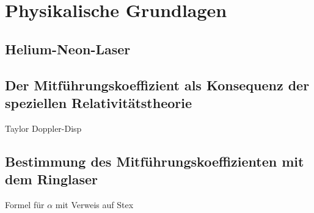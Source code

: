 \section{Physikalische Grundlagen}

\subsection{Helium-Neon-Laser}


\subsection{Der Mitführungskoeffizient als Konsequenz der speziellen Relativitätstheorie}

Taylor
Doppler-Disp


\subsection{Bestimmung des Mitführungskoeffizienten mit dem Ringlaser}


Formel für $\alpha$ mit Verweis auf Stex
